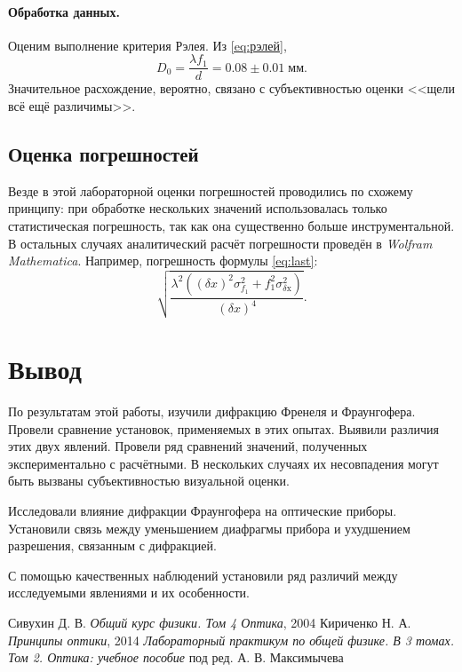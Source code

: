 \documentclass[a4paper]{article}
\begin{document}
\paragraph{Обработка данных.}

Оценим выполнение критерия Рэлея. Из \eqref{eq:рэлей},
\begin{equation}\label{eq:last}
	D_0 = \frac{\lambda f_1}{d} = 0.08\pm 0.01\; мм.
\end{equation}
Значительное расхождение, вероятно, связано с субъективностью оценки <<щели всё ещё различимы>>. 

\subsection{Оценка погрешностей}

Везде в этой лабораторной оценки погрешностей проводились по схожему принципу: при обработке нескольких значений использовалась только статистическая погрешность, так как она существенно больше инструментальной. В остальных случаях аналитический расчёт погрешности проведён в \emph{Wolfram Mathematica}. Например, погрешность формулы \eqref{eq:last}:
\begin{equation*}\label{key}
	\sqrt{\frac{\lambda ^2\left((\delta x)^2 \sigma _{f_1}^2+f_1^2 \sigma _{\text{$\delta $x}}^2\right)}{(\delta x)^4}}.
\end{equation*}

\section{Вывод}

По результатам этой работы, изучили дифракцию Френеля и Фраунгофера. Провели сравнение установок, применяемых в этих опытах. Выявили различия этих двух явлений. Провели ряд сравнений значений, полученных экспериментально с расчётными. В нескольких случаях их несовпадения могут быть вызваны субъективностью визуальной оценки.

Исследовали влияние дифракции Фраунгофера на оптические приборы. Установили связь между уменьшением диафрагмы прибора и ухудшением разрешения, связанным с дифракцией.

С помощью качественных наблюдений установили ряд различий между исследуемыми явлениями и их особенности.

\newpage

\begin{thebibliography}{9}
	 Сивухин Д. В. \emph{Общий курс физики. Том 4 Оптика}, 2004
	 Кириченко Н. А. \emph{Принципы оптики}, 2014
	 \emph{Лабораторный практикум по общей физике. В 3 томах. Том 2. Оптика: учебное пособие} под ред. А. В. Максимычева
\end{thebibliography}
\end{document}
